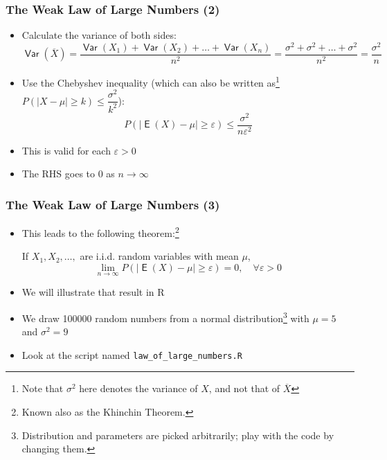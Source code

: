 \documentclass[10pt]{beamer}
\DeclareMathOperator{\E}{\mathsf{E}}
\DeclareMathOperator{\var}{\mathsf{Var}}
\theoremstyle{definition}
\begin{document}
\begin{frame}[fragile]
	\frametitle{The Weak Law of Large Numbers (2)}
	\begin{itemize}
		\item Calculate the variance of both sides:
		\[
			\var(\overline{X}) = \dfrac{\var(X_{1}) + \var(X_{2}) + \ldots + \var(X_{n})}{n^{2}} = \dfrac{\sigma^{2} + \sigma^{2} + \ldots + \sigma^{2}}{n^{2}} = \dfrac{\sigma^{2}}{n}
		\]
		
		\item Use the Chebyshev inequality (which can also be written as\footnote{Note that $ \sigma^{2} $ here denotes the variance of $ X $, and not that of $ \overline{X} $} $ P(|X - \mu| \geq k) \leq \dfrac{\sigma^{2}}{k^{2}} $):
		\[
			P(|\E(X) - \mu| \geq \varepsilon) \leq \dfrac{\sigma^{2}}{n\varepsilon^{2}}
		\]
		
		\item This is valid for each $ \varepsilon > 0 $
		
		\item The RHS goes to 0 as $ n \to \infty $
	\end{itemize}
\end{frame}

\begin{frame}[fragile]
	\frametitle{The Weak Law of Large Numbers (3)}
	\begin{itemize}
		\item This leads to the following theorem:\footnote{Known also as the Khinchin Theorem.}
		\begin{theorem}
			If $ X_{1}, X_{2},\ldots, $ are i.i.d. random variables with mean $ \mu $,
			\[
				\lim_{n\to\infty} P(|\E(X) - \mu| \geq \varepsilon) = 0, \quad \forall \varepsilon > 0
			\]
		\end{theorem}
	
		\item We will illustrate that result in R
		
		\item We draw 100000 random numbers from a normal distribution\footnote{Distribution and parameters are picked arbitrarily; play with the code by changing them.} with $ \mu = 5 $ and $ \sigma^{2} = 9 $ 
		
		\item Look at the script named \texttt{law\_of\_large\_numbers.R}
	\end{itemize}
\end{frame}
\end{document}
